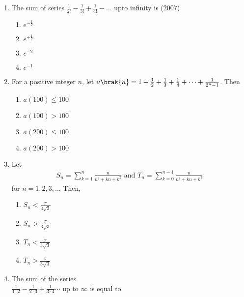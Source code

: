 \begin{enumerate}[label=\thesubsection.\arabic*,ref=\thesubsection.\theenumi]
    \item The sum of series $\frac{1}{2!}-\frac{1}{3!}+\frac{1}{4!}-\dots$ upto infinity is 
    \hfill(2007)
%
    \begin{enumerate}
    \item$e^{-\frac{1}{2}}$
    \item$e^{+\frac{1}{2}}$
    \item$e^{-2}$
    \item$e^{-1}$
    \end{enumerate}
\item For a positive integer $n$,  let
	$a\brak{n}=1+\frac{1}{2}+\frac{1}{3}+\frac{1}{4}+\dots+\frac{1}{2^n-1}$. Then \hfill{}
\begin{multicols}{4}
\begin{enumerate}    
\item $a(100)\leq 100$
\item $a(100) > 100$
\item $a(200)\leq 100$
\item $a(200) > 100$
\end{enumerate}
\end{multicols}
%
%
\item Let 
\begin{align*}
S_n=\sum_{k=1}^{n}\frac{n}{n^2+kn+k^2} \text{ and }   T_n=\sum_{k=0}^{n-1}\frac{n}{n^2+kn+k^2}
\end{align*}
for $n=1, 2, 3, \dots$ Then, \hfill{}
\begin{multicols}{4}
\begin{enumerate}    
\item $S_n<\frac{\pi}{3\sqrt{3}}$
\item $S_n>\frac{\pi}{3\sqrt{3}}$
\item $T_n<\frac{\pi}{3\sqrt{3}}$
\item $T_n>\frac{\pi}{3\sqrt{3}}$
\end{enumerate}
\end{multicols}
%
\item {The sum of the series \\ $\frac{1}{1\cdot2}-\frac{1}{2\cdot3}+\frac{1}{3\cdot4}\cdots \text{ up to } \infty$ is equal to} 
{\hfill{}} 
\begin{enumerate}
\end{enumerate}


\end{enumerate}
